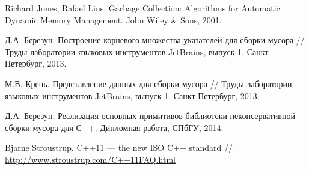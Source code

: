 
\begin{thebibliography}{}

Richard Jones, Rafael Lins. Garbage Collection: Algorithms for Automatic Dynamic Memory Management. John Wiley \& Sons, 2001.

Д.А. Березун. Построение корневого множества указателей для сборки мусора // Труды лаборатории языковых инструментов JetBrains, 
выпуск 1. Санкт-Петербург, 2013.

М.В. Крень. Представление данных для сборки мусора // Труды лаборатории языковых инструментов JetBrains, выпуск 1. Санкт-Петербург, 2013.


Д.А. Березун. Реализация основных примитивов библиотеки неконсервативной сборки мусора для С++. Дипломная работа, СПбГУ, 2014.


Bjarne Stroustrup. C++11 --- the new ISO C++ standard // \url{http://www.stroustrup.com/C++11FAQ.html}


\end{thebibliography}
